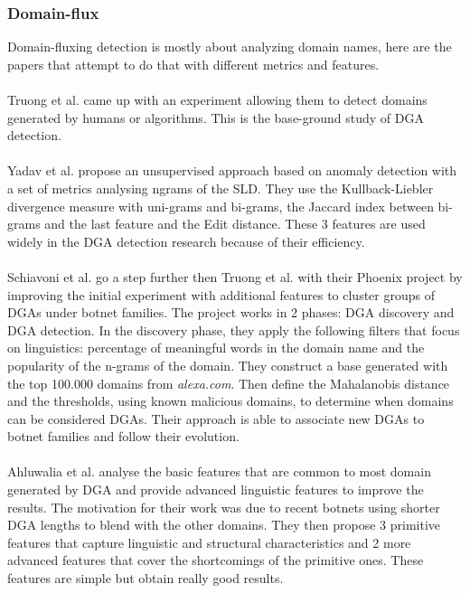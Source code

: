 \subsubsection{Domain-flux}
Domain-fluxing detection is mostly about analyzing domain names, here are the papers that attempt to do that with different metrics and features.\\
\\
Truong et al. \cite{dns-traffic} came up with an experiment allowing them to detect domains generated by humans or algorithms. This is the base-ground study of DGA detection.\\
\\
Yadav et al. \cite{dga2} propose an unsupervised approach based on anomaly detection with a set of metrics analysing ngrams of the SLD. They use the Kullback-Liebler divergence measure with uni-grams and bi-grams, the Jaccard index between bi-grams and the last feature and the Edit distance. These 3 features are used widely in the DGA detection research because of their efficiency.\\
\\
Schiavoni et al. \cite{phoenix} go a step further then Truong et al. with their Phoenix project by improving the initial experiment with additional features to cluster groups of DGAs under botnet families. The project works in 2 phases: DGA discovery and DGA detection. In the discovery phase, they apply the following filters that focus on linguistics: percentage of meaningful words in the domain name and the popularity of the n-grams of the domain. They construct a base generated with the top 100.000 domains from \textit{alexa.com}. Then define the Mahalanobis distance and the thresholds, using known malicious domains,  to determine when domains can be considered DGAs. Their approach is able to associate new DGAs to botnet families and follow their evolution.\\
\\
Ahluwalia et al. \cite{dga} analyse the basic features that are common to most domain generated by DGA and provide advanced linguistic features to improve the results. The motivation for their work was due to recent botnets using shorter DGA lengths to blend with the other domains. They then propose 3 primitive features that capture linguistic and structural characteristics and 2 more advanced features that cover the shortcomings of the primitive ones. These features are simple but obtain really good results.\\

